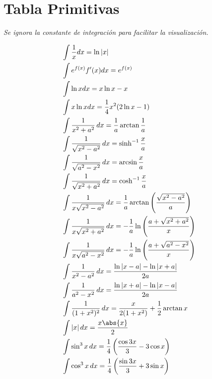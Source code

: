 \section{Tabla Primitivas}
\textit{Se ignora la constante de integración para facilitar la visualización.}

\begin{minipage}{0.55\textwidth}
\begin{equation}
\begin{split}
    &\int\frac{1}{x}dx  = \ln{|x|} \\
    &\int e^{f(x)}f'(x)dx  = e^{f(x)} \\
    &\int \ln{x}dx  = x\ln{x}-x \\
    &\int x\ln{x}dx  = \frac{1}{4}x^2(2\ln{x}-1) \\
    &\int\frac{1}{x^2+a^2}\,dx  = \frac{1}{a}\arctan{\frac{1}{a}}\\
    &\int\frac{1}{\sqrt{x^2-a^2}}\,dx  = \sinh^{-1}{\frac{x}{a}}\\
    &\int\frac{1}{\sqrt{a^2-x^2}}\,dx  = \arcsin{\frac{x}{a}}\\
    &\int \frac{1}{\sqrt{x^2+a^2}}\,dx  = \cosh^{-1}{\frac{x}{a}}\\
    &\int\frac{1}{x\sqrt{x^2-a^2}}\,dx  = \frac{1}{a}\arctan{\left(\frac{\sqrt{x^2-a^2}}{a}\right)}\\
    &\int\frac{1}{x\sqrt{x^2+a^2}}\,dx  = -\frac{1}{a}\ln{\left(\frac{
    a+\sqrt{x^2+a^2}}{x}\right)}\\
    &\int\frac{1}{x\sqrt{a^2-x^2}}\,dx  = -\frac{1}{a}\ln{\left(\frac{a+\sqrt{a^2-x^2}}{x}\right)}\\
    &\int\frac{1}{x^2-a^2}\,dx  = \frac{\ln{|x-a|}-\ln{|x+a|}}{2a}\\
    &\int\frac{1}{a^2-x^2}\,dx  = \frac{\ln{|x+a|}-\ln{|x-a|}}{2a}\\
    &\int\frac{1}{(1+x^2)^2}\,dx  = \frac{x}{2(1+x^2)}+\frac{1}{2}\arctan{x}\\
    &\int|x|\,dx  = \frac{x\abs{x}}{2}\\
    &\int \sin^3{x}\,dx = \frac{1}{4}\left(\frac{\cos{3x}}{3}-3\cos{x}\right)\\
    &\int \cos^3{x}\,dx = \frac{1}{4}\left(\frac{\sin{3x}}{3}+3\sin{x}\right)\\
\end{split}
\nonumber
\end{equation}
\end{minipage}
